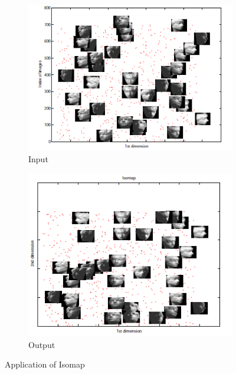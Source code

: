 \begin{figure}
\centering
\begin{subfigure}{.5\textwidth}
  \centering
  \includegraphics[width=\linewidth]{./Figures/original.png}
\caption{Input}
\end{subfigure}%
\begin{subfigure}{.5\textwidth}
  \centering
  \includegraphics[width=\linewidth]{./Figures/o_iso.png}
  \caption{Output}
\end{subfigure}
\caption{Application of Isomap}
\label{app_iso}
\end{figure}

